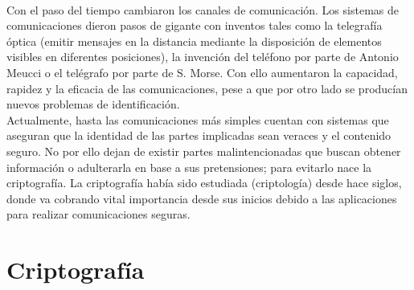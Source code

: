 \documentclass[../PFC.tex]{subfiles}
\begin{document}
\*
\vspace{0.5515cm}
\\
Con el paso del tiempo cambiaron los canales de comunicación. Los sistemas de comunicaciones dieron pasos de gigante con inventos tales como la telegrafía óptica (emitir mensajes en la distancia mediante la disposición de elementos visibles en diferentes posiciones), la invención del teléfono por parte de Antonio Meucci o el telégrafo por parte de S. Morse. Con ello aumentaron la capacidad, rapidez y la eficacia de las comunicaciones, pese a que por otro lado se producían nuevos problemas de identificación.
\*
\vspace{0.5515cm}
\\
Actualmente, hasta las comunicaciones más simples cuentan con sistemas que aseguran que la identidad de las partes implicadas sean veraces y el contenido seguro. No por ello dejan de existir partes malintencionadas que buscan obtener información o adulterarla en base a sus pretensiones; para evitarlo nace la criptografía. La criptografía había sido estudiada (criptología) desde hace siglos, donde va cobrando vital importancia desde sus inicios debido a las aplicaciones para realizar comunicaciones seguras.

\section{Criptografía}
\label{Criptografía}
\end{document}
